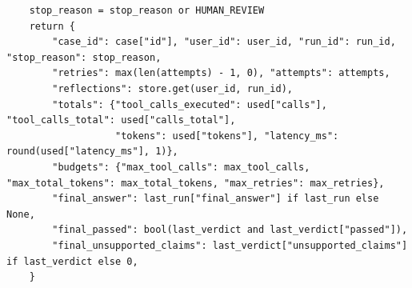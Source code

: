 \documentclass[11pt]{article}
\begin{document}
\begin{lstlisting}
    stop_reason = stop_reason or HUMAN_REVIEW
    return {
        "case_id": case["id"], "user_id": user_id, "run_id": run_id, "stop_reason": stop_reason,
        "retries": max(len(attempts) - 1, 0), "attempts": attempts,
        "reflections": store.get(user_id, run_id),
        "totals": {"tool_calls_executed": used["calls"], "tool_calls_total": used["calls_total"],
                   "tokens": used["tokens"], "latency_ms": round(used["latency_ms"], 1)},
        "budgets": {"max_tool_calls": max_tool_calls, "max_total_tokens": max_total_tokens, "max_retries": max_retries},
        "final_answer": last_run["final_answer"] if last_run else None,
        "final_passed": bool(last_verdict and last_verdict["passed"]),
        "final_unsupported_claims": last_verdict["unsupported_claims"] if last_verdict else 0,
    }
\end{lstlisting}
\endgroup
\end{document}
